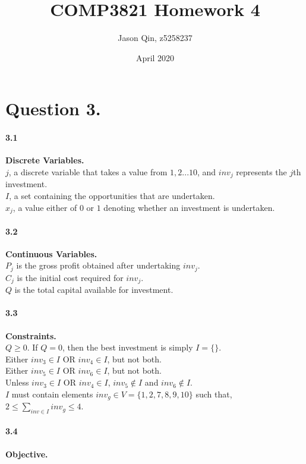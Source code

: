 \documentclass{article}
\title{COMP3821 Homework 4}
\author{Jason Qin, z5258237}
\date{April 2020}
\begin{document}
\maketitle

\section*{Question 3.}
\paragraph*{3.1} \textbf{Discrete Variables.} \\

\noindent
$j$, a discrete variable that takes a value from $1,2...10$, and $inv_j$ represents the $j$th investment. \\
$I$, a set containing the opportunities that are undertaken. \\
$x_j$, a value either of $0$ or $1$ denoting whether an investment is undertaken.

\paragraph*{3.2} \textbf{Continuous Variables.} \\

\noindent
$P_j$ is the gross profit obtained after undertaking $inv_j$. \\
$C_j$ is the initial cost required for $inv_j$. \\
$Q$ is the total capital available for investment.

\paragraph*{3.3} \textbf{Constraints.} \\

\noindent
$Q \geq 0$. If $Q = 0$, then the best investment is simply $I = \{\}$. \\
Either $inv_3 \in I$ OR $inv_4 \in I$, but not both. \\
Either $inv_5 \in I$ OR $inv_6 \in I$, but not both. \\
Unless $inv_3 \in I$ OR $inv_4 \in I$, $inv_5 \notin I$ and $inv_6 \notin I$. \\
$I$ must contain elements $inv_g \in V = \{1,2,7,8,9,10\}$ such that, $2 \leq \sum_{inv \in I} inv_g \leq 4$.

\paragraph*{3.4} \textbf{Objective.} \\
\end{document}
